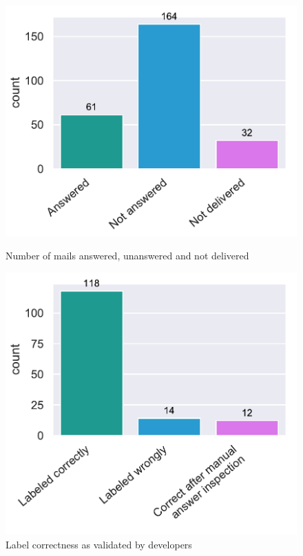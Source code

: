 \documentclass[\myrootdir/main.tex]{subfiles}
\begin{document}
\begin{figure}[htbp]
	\centering
	\begin{minipage}{0.45\textwidth}
		\centering
		\includegraphics[width=\textwidth, clip]{img/dev-mails/answers-received-mails.pdf}
		\caption{Number of mails answered, unanswered and not delivered}
		\label{fig:mails-answers-received-mails}
	\end{minipage}\hfill
	\begin{minipage}{0.45\textwidth}
		\centering
		\includegraphics[width=\textwidth, clip]{img/dev-mails/extraction-correct.pdf}
		\caption{Label correctness as validated by developers}
		\label{fig:mails-extraction-correct}
	\end{minipage}
\end{figure}
\end{document}

